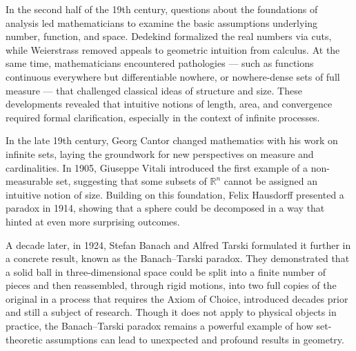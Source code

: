 \begin{historical}
In the second half of the 19th century, questions about the foundations of analysis led mathematicians to examine the basic assumptions underlying number, function, and space. Dedekind formalized the real numbers via cuts, while Weierstrass removed appeals to geometric intuition from calculus. At the same time, mathematicians encountered pathologies — such as functions continuous everywhere but differentiable nowhere, or nowhere-dense sets of full measure — that challenged classical ideas of structure and size. These developments revealed that intuitive notions of length, area, and convergence required formal clarification, especially in the context of infinite processes.

In the late 19th century, Georg Cantor changed mathematics with his work on infinite sets, laying the groundwork for new perspectives on measure and cardinalities. In 1905, Giuseppe Vitali introduced the first example of a non-measurable set, suggesting that some subsets of \( \mathbb{R}^n \) cannot be assigned an intuitive notion of size. Building on this foundation, Felix Hausdorff presented a paradox in 1914, showing that a sphere could be decomposed in a way that hinted at even more surprising outcomes.

A decade later, in 1924, Stefan Banach and Alfred Tarski formulated it further in a concrete result, known as the Banach–Tarski paradox. They demonstrated that a solid ball in three-dimensional space could be split into a finite number of pieces and then reassembled, through rigid motions, into two full copies of the original in a process that requires the Axiom of Choice, introduced decades prior and still a subject of research. Though it does not apply to physical objects in practice, the Banach–Tarski paradox remains a powerful example of how set-theoretic assumptions can lead to unexpected and profound results in geometry.
\end{historical}
